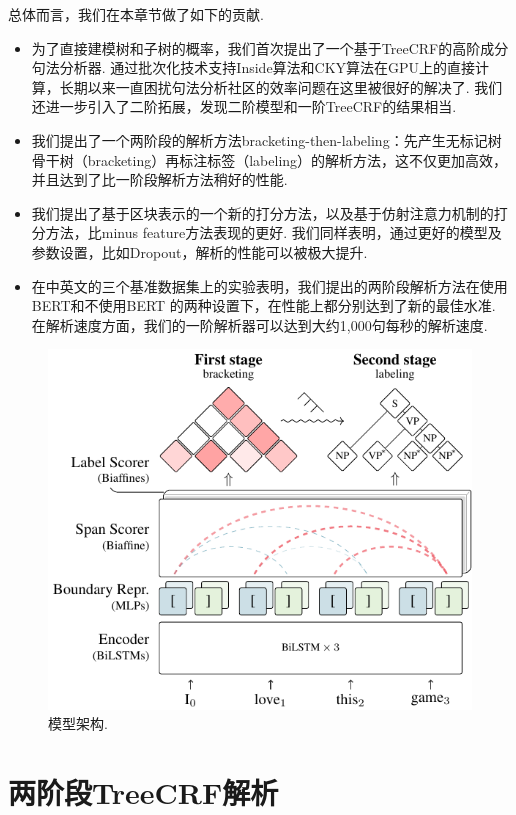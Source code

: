 总体而言，我们在本章节做了如下的贡献.
\begin{itemize}
  \item 为了直接建模树和子树的概率，我们首次提出了一个基于TreeCRF的高阶成分句法分析器.
        通过批次化技术支持Inside算法和CKY算法在GPU上的直接计算，长期以来一直困扰句法分析社区的效率问题在这里被很好的解决了.
        我们还进一步引入了二阶拓展，发现二阶模型和一阶TreeCRF的结果相当.
  \item 我们提出了一个两阶段的解析方法bracketing-then-labeling：先产生无标记树骨干树（bracketing）再标注标签（labeling）的解析方法，这不仅更加高效，并且达到了比一阶段解析方法稍好的性能.
  \item 我们提出了基于区块表示的一个新的打分方法，以及基于仿射注意力机制的打分方法，比minus feature方法表现的更好.
        我们同样表明，通过更好的模型及参数设置，比如Dropout，解析的性能可以被极大提升.
  \item 在中英文的三个基准数据集上的实验表明，我们提出的两阶段解析方法在使用BERT和不使用BERT \citep{devlin-etal-2019-bert}的两种设置下，在性能上都分别达到了新的最佳水准.
        在解析速度方面，我们的一阶解析器可以达到大约1,000句每秒的解析速度.
\end{itemize}

\begin{figure}[tb]
  \centering
  \includegraphics [scale=1.1]{figures/con-framework.pdf}
  \caption{模型架构.}
  \label{fig:con-framework}
\end{figure}

\section{两阶段TreeCRF解析}\label{sec:2stage-parsing}

